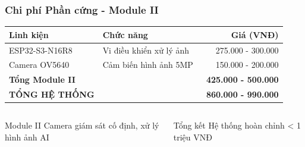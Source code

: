 \begin{frame}
\frametitle{Chi phí Phần cứng - Module II}

\begin{table}[h]
\centering
\begin{tabular}{|l|l|r|}
\hline
\textbf{Linh kiện} & \textbf{Chức năng} & \textbf{Giá (VNĐ)} \\
\hline
ESP32-S3-N16R8 & Vi điều khiển xử lý ảnh & 275.000 - 300.000 \\
Camera OV5640 & Cảm biến hình ảnh 5MP & 150.000 - 200.000 \\
\hline
\textbf{Tổng Module II} & & \textbf{~425.000 - 500.000} \\
\hline
\hline
\textbf{TỔNG HỆ THỐNG} & & \textbf{~860.000 - 990.000} \\
\hline
\end{tabular}
\end{table}

\begin{columns}
\begin{block}{Module II}
Camera giám sát cố định, xử lý hình ảnh AI
\end{block}

\begin{alertblock}{Tổng kết}
Hệ thống hoàn chỉnh < 1 triệu VNĐ
\end{alertblock}
\end{columns}

\end{frame}
